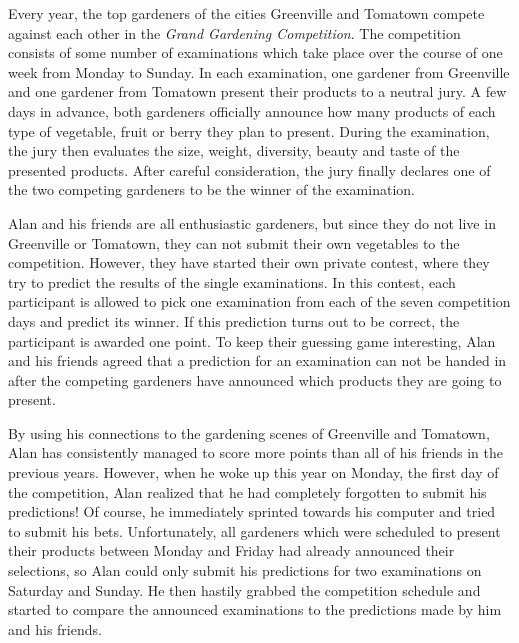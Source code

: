 
Every year, the top gardeners of the cities Greenville and Tomatown compete against each other in the \emph{Grand Gardening Competition}.
The competition consists of some number of examinations which take place over the course of one week from Monday to Sunday. In each examination, one gardener from Greenville and one gardener from Tomatown present their products to a neutral jury. A few days in advance, both gardeners officially announce how many products of each type of vegetable, fruit or berry they plan to present.
During the examination, the jury then evaluates the size, weight, diversity, beauty and taste of the presented products. After careful consideration, the jury finally declares one of the two competing gardeners to be the winner of the examination.

Alan  and his friends are all enthusiastic gardeners, but since they do not live in Greenville or Tomatown, they can not submit their own vegetables to the competition.
However, they have started their own private contest, where they try to predict the results of the single examinations.
In this contest, each participant is allowed to pick one examination from each of the seven competition days and predict its winner. If this prediction turns out to be correct, the participant is awarded one point.
To keep their guessing game interesting, Alan and his friends agreed that a prediction for an examination can not be handed in after the competing gardeners have announced which products they are going to present.

By using his connections to the gardening scenes of Greenville and Tomatown, Alan  has consistently managed to score more points than all of his friends in the previous years.
However, when he woke up this year on Monday, the first day of the competition, Alan  realized that he had completely forgotten to submit his predictions!
Of course, he immediately sprinted towards his computer and tried to submit his bets. Unfortunately, all gardeners which were scheduled to present their products between Monday and Friday had already announced their selections, so Alan  could only submit his predictions for two examinations on Saturday and Sunday.
He then hastily grabbed the competition schedule and started to compare the announced examinations to the predictions made by him and his friends.

